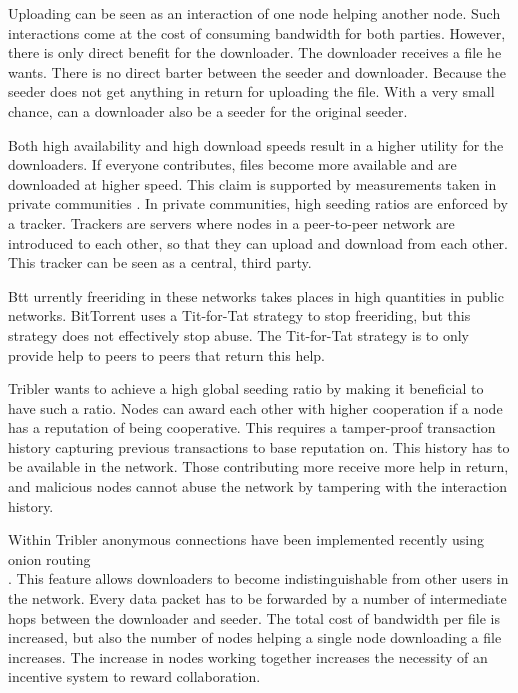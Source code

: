 Uploading can be seen as an interaction of one node helping another node.
Such interactions come at the cost of consuming bandwidth for both parties.
However, there is only direct benefit for the downloader.
The downloader receives a file he wants.
There is no direct barter between the seeder and downloader.
Because the seeder does not get anything in return for uploading the file.
With a very small chance, can a downloader also be a seeder for the original seeder\cite{Lai-Incentives}.

Both high availability and high download speeds result in a higher utility for the downloaders.
If everyone contributes, files become more available and are downloaded at higher speed.
This claim is supported by measurements taken in private communities
\cite{meulpolder-privatecommunities}.
In private communities, high seeding ratios are enforced by a tracker.
Trackers are servers where nodes in a peer-to-peer network are introduced to each other,
so that they can upload and download from each other\cite{cohen-titfortat}.
This tracker can be seen as a central, third party.

Btt urrently freeriding in these networks takes places in high quantities in public networks\cite{Adar-Freeriding}.
BitTorrent uses a Tit-for-Tat strategy\cite{cohen-titfortat} to stop freeriding,
but this strategy does not effectively stop abuse\cite{Pouwelse-tribler}.
The Tit-for-Tat strategy is to only provide help to peers to peers that return this help.

Tribler wants to achieve a high global seeding ratio by making it beneficial to have such a ratio.
Nodes can award each other with higher cooperation if a node has a reputation of being cooperative.
This requires a tamper-proof transaction history capturing previous transactions to base reputation on.
This history has to be available in the network.
Those contributing more receive more help in return,
and malicious nodes cannot abuse the network by tampering with the interaction history.

Within Tribler anonymous connections have been implemented recently using onion routing \\\cite{Plak-anonymous}\cite{ruigrok-anonymous}\cite{tanaskoski-anonymous}.
This feature allows downloaders to become indistinguishable from other users in the network.
Every data packet has to be forwarded
by a number of intermediate hops between the downloader and seeder\cite{Plak-anonymous}\cite{tanaskoski-anonymous}.
The total cost of bandwidth per file is increased,
but also the number of nodes helping a single node downloading a file increases.
The increase in nodes working together increases the necessity of an incentive system to reward collaboration.

